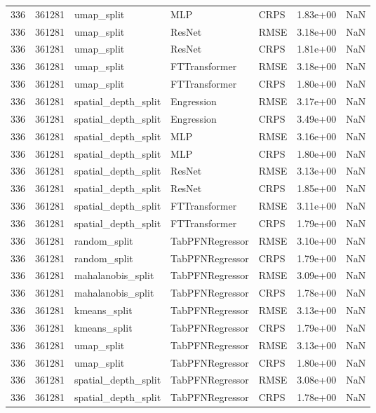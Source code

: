 \begin{tabular}{rrlllrr}
336 & 361281 & umap\_split & MLP & CRPS & 1.83e+00 & NaN \\
336 & 361281 & umap\_split & ResNet & RMSE & 3.18e+00 & NaN \\
336 & 361281 & umap\_split & ResNet & CRPS & 1.81e+00 & NaN \\
336 & 361281 & umap\_split & FTTransformer & RMSE & 3.18e+00 & NaN \\
336 & 361281 & umap\_split & FTTransformer & CRPS & 1.80e+00 & NaN \\
336 & 361281 & spatial\_depth\_split & Engression & RMSE & 3.17e+00 & NaN \\
336 & 361281 & spatial\_depth\_split & Engression & CRPS & 3.49e+00 & NaN \\
336 & 361281 & spatial\_depth\_split & MLP & RMSE & 3.16e+00 & NaN \\
336 & 361281 & spatial\_depth\_split & MLP & CRPS & 1.80e+00 & NaN \\
336 & 361281 & spatial\_depth\_split & ResNet & RMSE & 3.13e+00 & NaN \\
336 & 361281 & spatial\_depth\_split & ResNet & CRPS & 1.85e+00 & NaN \\
336 & 361281 & spatial\_depth\_split & FTTransformer & RMSE & 3.11e+00 & NaN \\
336 & 361281 & spatial\_depth\_split & FTTransformer & CRPS & 1.79e+00 & NaN \\
336 & 361281 & random\_split & TabPFNRegressor & RMSE & 3.10e+00 & NaN \\
336 & 361281 & random\_split & TabPFNRegressor & CRPS & 1.79e+00 & NaN \\
336 & 361281 & mahalanobis\_split & TabPFNRegressor & RMSE & 3.09e+00 & NaN \\
336 & 361281 & mahalanobis\_split & TabPFNRegressor & CRPS & 1.78e+00 & NaN \\
336 & 361281 & kmeans\_split & TabPFNRegressor & RMSE & 3.13e+00 & NaN \\
336 & 361281 & kmeans\_split & TabPFNRegressor & CRPS & 1.79e+00 & NaN \\
336 & 361281 & umap\_split & TabPFNRegressor & RMSE & 3.13e+00 & NaN \\
336 & 361281 & umap\_split & TabPFNRegressor & CRPS & 1.80e+00 & NaN \\
336 & 361281 & spatial\_depth\_split & TabPFNRegressor & RMSE & 3.08e+00 & NaN \\
336 & 361281 & spatial\_depth\_split & TabPFNRegressor & CRPS & 1.78e+00 & NaN \\

\end{tabular}
